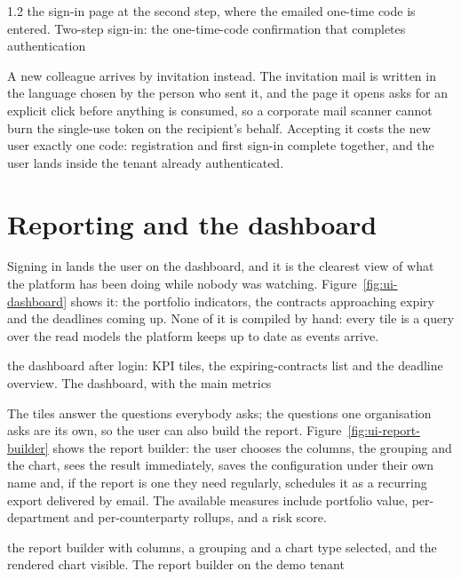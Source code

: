 \begin{spacing}{1.2}
  {the sign-in page at the second step, where the emailed one-time code
   is entered.}
  {Two-step sign-in: the one-time-code confirmation that completes
   authentication}

A new colleague arrives by invitation instead. The invitation mail is
written in the language chosen by the person who sent it, and the page
it opens asks for an explicit click before anything is consumed, so a
corporate mail scanner cannot burn the single-use token on the
recipient's behalf. Accepting it costs the new user exactly one code:
registration and first sign-in complete together, and the user lands
inside the tenant already authenticated.

\section{Reporting and the dashboard}
\label{sec:walk-reporting}

Signing in lands the user on the dashboard, and it is the clearest view
of what the platform has been doing while nobody was watching.
Figure~\ref{fig:ui-dashboard} shows it: the portfolio indicators, the
contracts approaching expiry and the deadlines coming up. None of it is
compiled by hand: every tile is a query over the read models the
platform keeps up to date as events arrive.

  {the dashboard after login: KPI tiles, the expiring-contracts list
   and the deadline overview.}
  {The dashboard, with the main metrics}

The tiles answer the questions everybody asks; the questions one
organisation asks are its own, so the user can also build the report.
Figure~\ref{fig:ui-report-builder} shows the report builder: the user
chooses the columns, the grouping and the chart, sees the result
immediately, saves the configuration under their own name and, if the
report is one they need regularly, schedules it as a recurring export
delivered by email. The available measures include portfolio value,
per-department and per-counterparty rollups, and a risk score.

  {the report builder with columns, a grouping and a chart type
   selected, and the rendered chart visible.}
  {The report builder on the demo tenant}


\end{spacing}
